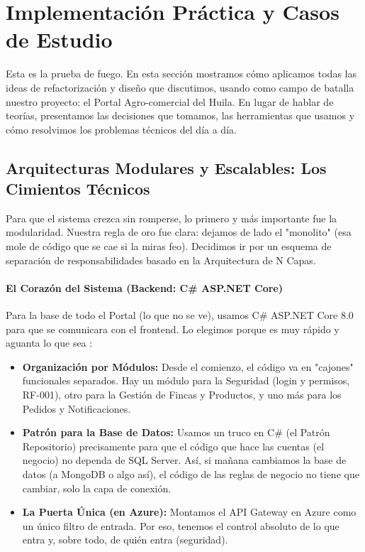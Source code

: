 \section{Implementación Práctica y Casos de Estudio}

Esta es la prueba de fuego. En esta sección mostramos cómo aplicamos todas las ideas de refactorización y diseño que discutimos, usando como campo de batalla nuestro proyecto: el Portal Agro-comercial del Huila. En lugar de hablar de teorías, presentamos las decisiones que tomamos, las herramientas que usamos y cómo resolvimos los problemas técnicos del día a día.

\subsection{Arquitecturas Modulares y Escalables: Los Cimientos Técnicos}

Para que el sistema crezca sin romperse, lo primero y más importante fue la modularidad. Nuestra regla de oro fue clara: dejamos de lado el "monolito" (esa mole de código que se cae si la miras feo). Decidimos ir por un esquema de separación de responsabilidades basado en la Arquitectura de N Capas.

\paragraph{El Corazón del Sistema (Backend: C\# ASP.NET Core)}

Para la base de todo el Portal (lo que no se ve), usamos C\# ASP.NET Core 8.0 para que se comunicara con el frontend. Lo elegimos porque es muy rápido y aguanta lo que sea \cite{adyen2021}:

\begin{itemize}
\item \textbf{Organización por Módulos:} Desde el comienzo, el código va en "cajones" funcionales separados. Hay un módulo para la Seguridad (login y permisos, RF-001), otro para la Gestión de Fincas y Productos, y uno más para los Pedidos y Notificaciones.

\item \textbf{Patrón para la Base de Datos:} Usamos un truco en C\# (el Patrón Repositorio) precisamente para que el código que hace las cuentas (el negocio) no dependa de SQL Server. Así, si mañana cambiamos la base de datos (a MongoDB o algo así), el código de las reglas de negocio no tiene que cambiar, solo la capa de conexión.

\item \textbf{La Puerta Única (en Azure):} Montamos el API Gateway en Azure como un único filtro de entrada. Por eso, tenemos el control absoluto de lo que entra y, sobre todo, de quién entra (seguridad).
\end{itemize}

